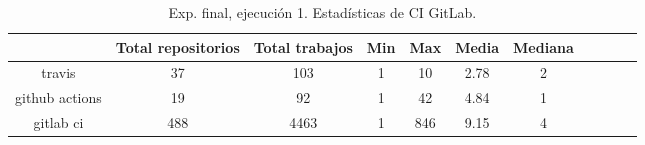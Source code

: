 \begin{table}[h]
  \centering
  \caption{Exp. final, ejecución 1. Estadísticas de CI GitLab.}
  \label{tab:tabla_f1_7}

\begin{footnotesize}
\renewcommand{\arraystretch}{1.5} %
\begin{tabular}{ccccccccccc}
  \hline
  {} &  Total repositorios &  Total trabajos &  Min &  Max &  Media &  Mediana \\
  \hline
  travis         &         37 &         103 &    1 &   10 &   2.78 &        2 \\
  github actions &         19 &          92 &    1 &   42 &   4.84 &        1 \\
  gitlab ci      &        488 &        4463 &    1 &  846 &   9.15 &        4 \\
 \end{tabular}
\end{footnotesize}

\end{table}

